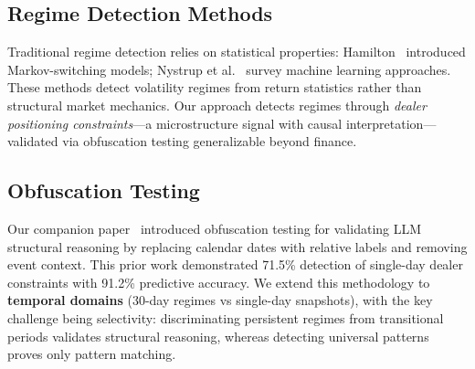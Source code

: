 \subsection{Regime Detection Methods}

Traditional regime detection relies on statistical properties: Hamilton~\cite{hamilton1989new} introduced Markov-switching models; Nystrup et al.~\cite{nystrup2020regime} survey machine learning approaches. These methods detect volatility regimes from return statistics rather than structural market mechanics. Our approach detects regimes through \textit{dealer positioning constraints}---a microstructure signal with causal interpretation---validated via obfuscation testing generalizable beyond finance.

\subsection{Obfuscation Testing}

Our companion paper~\cite{regan2025obfuscation} introduced obfuscation testing for validating LLM structural reasoning by replacing calendar dates with relative labels and removing event context. This prior work demonstrated 71.5\% detection of single-day dealer constraints with 91.2\% predictive accuracy. We extend this methodology to \textbf{temporal domains} (30-day regimes vs single-day snapshots), with the key challenge being selectivity: discriminating persistent regimes from transitional periods validates structural reasoning, whereas detecting universal patterns proves only pattern matching.
